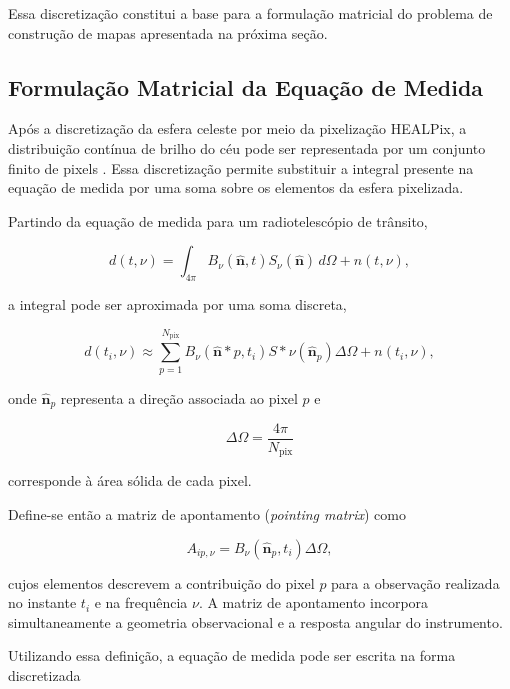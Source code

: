 Essa discretização constitui a base para a formulação matricial do problema de construção de mapas apresentada na próxima seção.


\subsection{Formulação Matricial da Equação de Medida}

Após a discretização da esfera celeste por meio da pixelização HEALPix, a distribuição contínua de brilho do céu pode ser representada por um conjunto finito de pixels \cite{gorski2005healpix}. Essa discretização permite substituir a integral presente na equação de medida por uma soma sobre os elementos da esfera pixelizada.

Partindo da equação de medida para um radiotelescópio de trânsito,

\begin{equation}
d(t,\nu)
=
\int_{4\pi}
B_\nu(\hat{\mathbf n},t)
S_\nu(\hat{\mathbf n})
\,d\Omega
+
n(t,\nu),
\end{equation}

a integral pode ser aproximada por uma soma discreta,

\begin{equation}
d(t_i,\nu)
\approx
\sum_{p=1}^{N_{\mathrm{pix}}}
B_\nu(\hat{\mathbf n}*p,t_i)
S*\nu(\hat{\mathbf n}_p)
\Delta\Omega
+
n(t_i,\nu),
\end{equation}

onde $\hat{\mathbf n}_p$ representa a direção associada ao pixel $p$ e

\begin{equation}
\Delta\Omega=
\frac{4\pi}{N_{\mathrm{pix}}}
\end{equation}

corresponde à área sólida de cada pixel.

Define-se então a matriz de apontamento (\textit{pointing matrix}) como

\begin{equation}
A_{ip,\nu}
=
B_\nu(\hat{\mathbf n}_p,t_i)
\Delta\Omega,
\label{pointing matrix}
\end{equation}

cujos elementos descrevem a contribuição do pixel $p$ para a observação realizada no instante $t_i$ e na frequência $\nu$. A matriz de apontamento incorpora simultaneamente a geometria observacional e a resposta angular do instrumento.

Utilizando essa definição, a equação de medida pode ser escrita na forma discretizada

